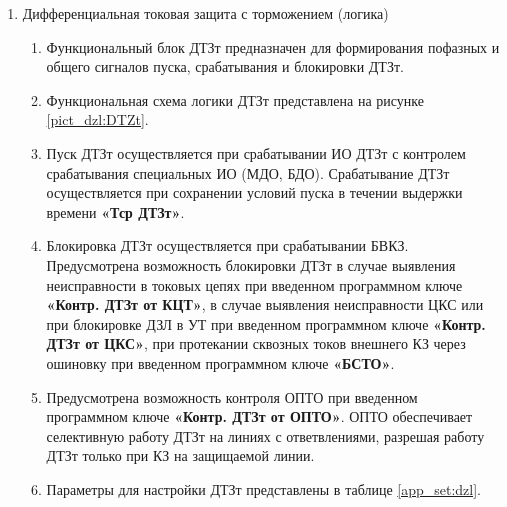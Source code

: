 \begin{enumerate}
\item Дифференциальная токовая защита с торможением (логика)
\begin{enumerate}
\item Функциональный блок ДТЗт предназначен для формирования пофазных и общего сигналов пуска, срабатывания и блокировки ДТЗт.
\item Функциональная схема логики ДТЗт представлена на рисунке \ref{pict_dzl:DTZt}.
\item Пуск ДТЗт осуществляется при срабатывании ИО ДТЗт с контролем срабатывания специальных ИО (МДО, БДО). Срабатывание ДТЗт осуществляется при сохранении условий пуска в течении выдержки времени \textbf{«Тср ДТЗт»}.
\item Блокировка ДТЗт осуществляется при срабатывании БВКЗ. Предусмотрена возможность блокировки ДТЗт в случае выявления неисправности в токовых цепях при введенном программном ключе \textbf{«Контр. ДТЗт от КЦТ»}, в случае выявления неисправности ЦКС или при блокировке ДЗЛ в УТ при введенном программном ключе \textbf{«Контр. ДТЗт от ЦКС»}, при протекании сквозных токов внешнего КЗ через ошиновку при введенном программном ключе \textbf{«БСТО»}.
\item Предусмотрена возможность контроля ОПТО при введенном программном ключе \textbf{«Контр. ДТЗт от ОПТО»}. ОПТО обеспечивает селективную работу ДТЗт на линиях с ответвлениями, разрешая работу ДТЗт только при КЗ на защищаемой линии.
\item Параметры для настройки ДТЗт представлены в таблице \ref{app_set:dzl}.
\end{enumerate}


\end{enumerate}
